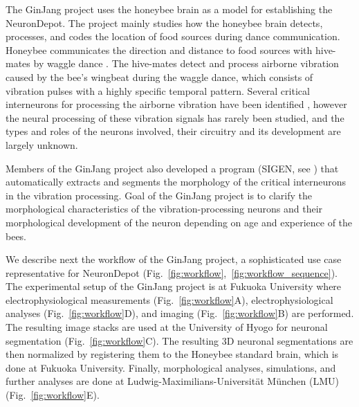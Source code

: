 \documentclass{frontiersSCNS} %
\begin{document}
The GinJang project uses the honeybee brain as a model for establishing the
NeuronDepot. The project mainly studies how the honeybee brain detects,
processes, and codes the location of food sources during dance communication.
Honeybee communicates the direction and distance to food sources with
hive-mates by waggle dance \citep{Frisch1967}. The hive-mates detect and
process airborne vibration caused by the bee's wingbeat during the waggle
dance, which consists of vibration pulses with a highly specific temporal
pattern. Several critical interneurons for processing the airborne vibration
have been identified \citep{Ai2007, Ai2009, Ai2010, Ai2012, Ai2013}, however
the neural processing of these vibration signals has rarely been studied, and
the types and roles of the neurons involved, their circuitry and its
development are largely unknown. 

Members of the GinJang project also developed a program (SIGEN, see
\citep{Minemoto}) that automatically extracts and segments the morphology of
the critical interneurons in the vibration processing. Goal of the GinJang
project is to clarify the morphological characteristics of the
vibration-processing neurons and their morphological development of the neuron
depending on age and experience of the bees.  

We describe next the workflow of the GinJang project, a sophisticated use case
representative for NeuronDepot
(Fig.~\ref{fig:workflow},~\ref{fig:workflow_sequence}). The experimental setup
of the GinJang project is at Fukuoka University where electrophysiological
measurements (Fig.~\ref{fig:workflow}A), electrophysiological analyses
(Fig.~\ref{fig:workflow}D), and imaging (Fig.~\ref{fig:workflow}B) are
performed. The resulting image stacks are used at the University of Hyogo for
neuronal segmentation (Fig.~\ref{fig:workflow}C). The resulting 3D neuronal
segmentations are then normalized by registering them to the Honeybee standard
brain, which is done at Fukuoka University. Finally, morphological analyses,
simulations, and further analyses are done at Ludwig-Maximilians-Universität
München (LMU) (Fig.~\ref{fig:workflow}E).
\end{document}
